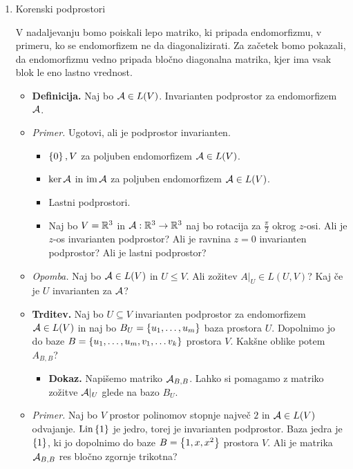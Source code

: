 \begin{enumerate}
    \newpage
    \item Korenski podprostori
    
    V nadaljevanju bomo poiskali lepo matriko, ki pripada endomorfizmu, v primeru, ko se endomorfizem ne da diagonalizirati. Za začetek bomo pokazali, da endomorfizmu vedno pripada bločno diagonalna matrika, kjer ima vsak blok le eno lastno vrednost.
    \begin{itemize}
        \item \colorbox{purple!30}{\textbf{Definicija.}} Naj bo $\mathcal{A} \in L(V)$. Invarianten podprostor za endomorfizem $\mathcal{A}$.
        \item \colorbox{yellow!30}{\emph{Primer.}} Ugotovi, ali je podprostor invarianten.
        \begin{itemize}
            \item $\left\{0\right\}, V$ za poljuben endomorfizem $\mathcal{A} \in L(V)$.
            \item $\ker \mathcal{A}$ in $\operatorname{im} \mathcal{A}$ za poljuben endomorfizem $\mathcal{A} \in L(V)$.
            \item Lastni podprostori.
            \item Naj bo $V = \mathbb{R}^3$ in $\mathcal{A}: \mathbb{R}^3 \to \mathbb{R}^3$ naj bo rotacija za $\frac{\pi}{2}$ okrog $z$-osi. Ali je $z$-os invarianten podprostor? Ali je ravnina $z=0$ invarianten podprostor? Ali je lastni podprostor?
        \end{itemize}
        \item \colorbox{yellow!30}{\emph{Opomba.}} Naj bo $\mathcal{A} \in L(V)$ in $U \leq V$. Ali zožitev $A|_U \in L(U, V)$? Kaj če je $U$ invarianten za $\mathcal{A}$?
        \item \colorbox{blue!30}{\textbf{Trditev.}} Naj bo $U \subseteq V$ invarianten podprostor za endomorfizem $\mathcal{A} \in L(V)$ in naj bo $B_U = \left\{u_1, \ldots, u_m\right\}$ baza prostora $U$. Dopolnimo jo do baze $B = \left\{u_1, \ldots, u_m, v_1, \ldots v_k\right\}$ prostora $V$. Kakšne oblike potem $A_{B, B}$?
        \begin{itemize}
            \item \colorbox{green!30}{\textbf{Dokaz.}} Napišemo matriko $\mathcal{A}_{B, B}$. Lahko si pomagamo z matriko zožitve $\mathcal{A}|_U$ glede na bazo $B_U$.
        \end{itemize}
        \item \colorbox{yellow!30}{\emph{Primer.}} Naj bo $V$ prostor polinomov stopnje največ $2$ in $\mathcal{A} \in L(V)$ odvajanje. $\operatorname{Lin} \left\{1\right\}$ je jedro, torej je invarianten podprostor. Baza jedra je $\left\{1\right\}$, ki jo dopolnimo do baze $B = \left\{1, x, x^2\right\}$ prostora $V$. Ali je matrika $\mathcal{A}_{B, B}$ res bločno zgornje trikotna? 

\end{itemize}
\end{enumerate}

